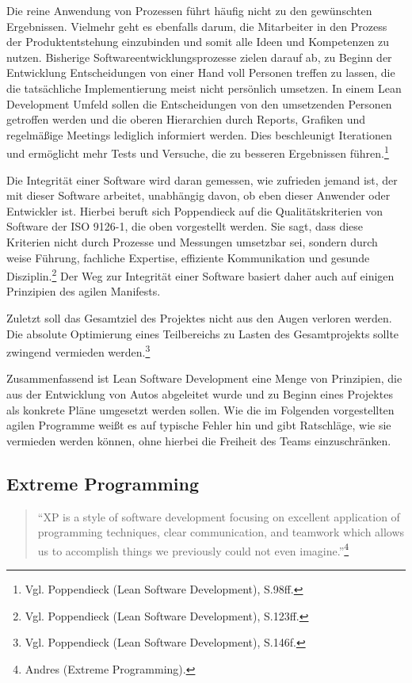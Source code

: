             Die reine Anwendung von Prozessen führt häufig nicht zu den gewünschten Ergebnissen. Vielmehr geht es ebenfalls darum, die Mitarbeiter in den Prozess der Produktentstehung einzubinden und somit alle Ideen und Kompetenzen zu nutzen. Bisherige Softwareentwicklungsprozesse zielen darauf ab, zu Beginn der Entwicklung Entscheidungen von einer Hand voll Personen treffen zu lassen, die die tatsächliche Implementierung meist nicht persönlich umsetzen. In einem Lean Development Umfeld sollen die Entscheidungen von den umsetzenden Personen getroffen werden und die oberen Hierarchien durch Reports, Grafiken und regelmäßige Meetings lediglich informiert werden. Dies beschleunigt Iterationen und ermöglicht mehr Tests und Versuche, die zu besseren Ergebnissen führen.\footnote{Vgl. Poppendieck (Lean Software Development), S.98ff.}

            Die Integrität einer Software wird daran gemessen, wie zufrieden jemand ist, der mit dieser Software arbeitet, unabhängig davon, ob eben dieser Anwender oder Entwickler ist. Hierbei beruft sich Poppendieck auf die Qualitätskriterien von Software der ISO 9126-1, die oben vorgestellt werden. Sie sagt, dass diese Kriterien nicht durch Prozesse und Messungen umsetzbar sei, sondern durch weise Führung, fachliche Expertise, effiziente Kommunikation und gesunde Disziplin.\footnote{Vgl. Poppendieck (Lean Software Development), S.123ff.} Der Weg zur Integrität einer Software basiert daher auch auf einigen Prinzipien des agilen Manifests.

            Zuletzt soll das Gesamtziel des Projektes nicht aus den Augen verloren werden. Die absolute Optimierung eines Teilbereichs zu Lasten des Gesamtprojekts sollte zwingend vermieden werden.\footnote{Vgl. Poppendieck (Lean Software Development), S.146f.}

            Zusammenfassend ist Lean Software Development eine Menge von Prinzipien, die aus der Entwicklung von Autos abgeleitet wurde und zu Beginn eines Projektes als konkrete Pläne umgesetzt werden sollen. Wie die im Folgenden vorgestellten agilen Programme weißt es auf typische Fehler hin und gibt Ratschläge, wie sie vermieden werden können, ohne hierbei die Freiheit des Teams einzuschränken.

        \subsection{Extreme Programming}

            \begin{quote}
                \enquote{XP is a style of software development focusing on excellent application of programming techniques, clear communication, and teamwork which allows us to accomplish things we previously could not even imagine.}\footnote{Andres (Extreme Programming).}
            \end{quote}

